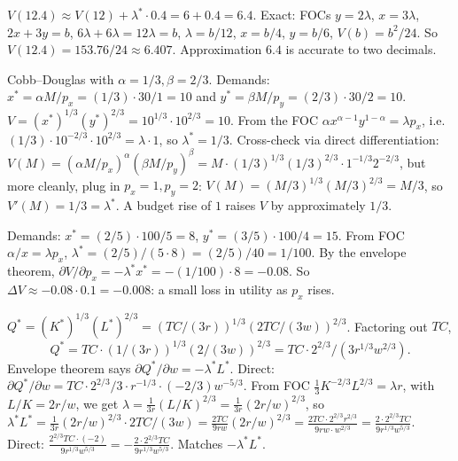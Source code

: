 \begin{solutions}
  \item $V(12.4) \approx V(12) + \lambda^* \cdot 0.4 = 6 + 0.4 = 6.4$.
        Exact:
        FOCs $y = 2 \lambda$, $x = 3 \lambda$, $2 x + 3 y = b$,
        $6 \lambda + 6 \lambda = 12 \lambda = b$, $\lambda = b/12$,
        $x = b/4$, $y = b/6$, $V(b) = b^2/24$. So
        $V(12.4) = 153.76/24 \approx 6.407$. Approximation $6.4$ is
        accurate to two decimals.

  \item Cobb--Douglas with $\alpha = 1/3, \beta = 2/3$. Demands:
        $x^* = \alpha M/p_x = (1/3) \cdot 30 / 1 = 10$ and
        $y^* = \beta M / p_y = (2/3) \cdot 30 / 2 = 10$.
        $V = (x^*)^{1/3}(y^*)^{2/3} = 10^{1/3} \cdot 10^{2/3} = 10$. From
        the FOC $\alpha x^{\alpha - 1} y^{1 - \alpha} = \lambda p_x$,
        i.e.\ $(1/3) \cdot 10^{-2/3} \cdot 10^{2/3} = \lambda \cdot 1$, so
        $\lambda^* = 1/3$. Cross-check via direct differentiation:
        $V(M) = (\alpha M/p_x)^\alpha (\beta M/p_y)^\beta
        = M \cdot (1/3)^{1/3}(1/3)^{2/3} \cdot 1^{-1/3} 2^{-2/3}$, but
        more cleanly, plug in $p_x = 1, p_y = 2$:
        $V(M) = (M/3)^{1/3}(M/3)^{2/3} = M/3$, so
        $V'(M) = 1/3 = \lambda^*$. \checkmark A budget rise of $1$ raises
        $V$ by approximately $1/3$.

  \item Demands: $x^* = (2/5) \cdot 100/5 = 8$,
        $y^* = (3/5) \cdot 100/4 = 15$. From FOC
        $\alpha/x = \lambda p_x$,
        $\lambda^* = (2/5)/(5 \cdot 8) = (2/5)/40 = 1/100$. By the
        envelope theorem,
        $\partial V/\partial p_x = -\lambda^* x^* = -(1/100) \cdot 8
        = -0.08$. So $\Delta V \approx -0.08 \cdot 0.1 = -0.008$: a small
        loss in utility as $p_x$ rises.

  \item $Q^* = (K^*)^{1/3}(L^*)^{2/3}
        = (TC/(3 r))^{1/3}(2 TC/(3 w))^{2/3}$. Factoring out $TC$,
        \[
          Q^* = TC \cdot (1/(3 r))^{1/3}(2/(3 w))^{2/3}
              = TC \cdot 2^{2/3}/(3 r^{1/3} w^{2/3}).
        \]
        Envelope theorem says
        $\partial Q^*/\partial w = -\lambda^* L^*$. Direct:
        $\partial Q^*/\partial w = TC \cdot 2^{2/3}/3 \cdot r^{-1/3}
        \cdot (-2/3) w^{-5/3}$. From FOC
        $\tfrac{1}{3} K^{-2/3} L^{2/3} = \lambda r$, with $L/K = 2 r/w$,
        we get $\lambda = \tfrac{1}{3 r}(L/K)^{2/3}
        = \tfrac{1}{3 r}(2 r/w)^{2/3}$, so
        $\lambda^* L^* = \tfrac{1}{3 r}(2 r/w)^{2/3} \cdot 2 TC/(3 w)
        = \tfrac{2 TC}{9 r w}(2 r/w)^{2/3}
        = \tfrac{2 TC \cdot 2^{2/3} r^{2/3}}{9 r w \cdot w^{2/3}}
        = \tfrac{2 \cdot 2^{2/3} TC}{9 r^{1/3} w^{5/3}}$. Direct:
        $\tfrac{2^{2/3} TC \cdot (-2)}{9 r^{1/3} w^{5/3}}
        = -\tfrac{2 \cdot 2^{2/3} TC}{9 r^{1/3} w^{5/3}}$. Matches
        $-\lambda^* L^*$. \checkmark


\end{solutions}
